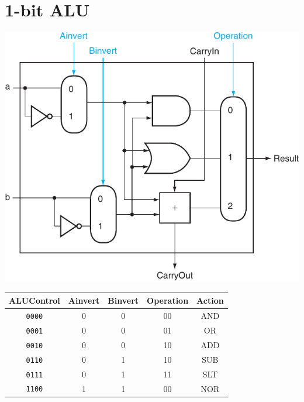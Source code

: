 \documentclass[10pt]{article}
\begin{document}
\begin{minipage}[t]{0.35\linewidth}
    \begin{minipage}[t]{\linewidth}
        \section*{1-bit ALU}
        \includegraphics[width=\linewidth]{content/alu.pdf}
    \end{minipage}
    \begin{minipage}[t]{\linewidth}
        \centering
        \begin{tabular}[t]{c|ccc|c}
            \toprule
            ALUControl & Ainvert & Binvert & Operation & Action \\
            \midrule
            {\tt 0000} & 0       & 0       & 00        & AND    \\
            {\tt 0001} & 0       & 0       & 01        & OR     \\
            {\tt 0010} & 0       & 0       & 10        & ADD    \\
            {\tt 0110} & 0       & 1       & 10        & SUB    \\
            {\tt 0111} & 0       & 1       & 11        & SLT    \\
            {\tt 1100} & 1       & 1       & 00        & NOR    \\
            \bottomrule
        \end{tabular}
    \end{minipage}
\end{minipage}
\end{document}
